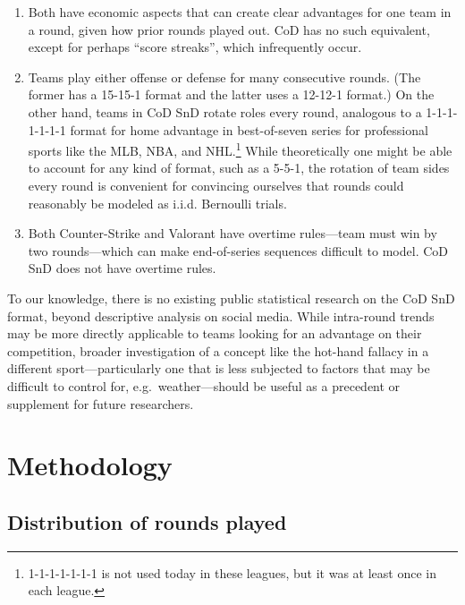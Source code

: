 \documentclass{article}
\providecommand{\tightlist}{%
  \setlength{\itemsep}{0pt}\setlength{\parskip}{0pt}}
\begin{document}
\begin{enumerate}
\def\labelenumi{\arabic{enumi}.}
\tightlist
\item
  Both have economic aspects that can create clear advantages for one
  team in a round, given how prior rounds played out. CoD has no such
  equivalent, except for perhaps ``score streaks'', which infrequently
  occur.
\item
  Teams play either offense or defense for many consecutive rounds. (The
  former has a 15-15-1 format and the latter uses a 12-12-1 format.) On
  the other hand, teams in CoD SnD rotate roles every round, analogous
  to a 1-1-1-1-1-1-1 format for home advantage in best-of-seven series
  for professional sports like the MLB, NBA, and NHL.\footnote{1-1-1-1-1-1-1
    is not used today in these leagues, but it was at least once in each
    league.} While theoretically one might be able to account for any
  kind of format, such as a 5-5-1, the rotation of team sides every
  round is convenient for convincing ourselves that rounds could
  reasonably be modeled as i.i.d. Bernoulli trials.
\item
  Both Counter-Strike and Valorant have overtime rules---team must win
  by two rounds---which can make end-of-series sequences difficult to
  model. CoD SnD does not have overtime rules.
\end{enumerate}

To our knowledge, there is no existing public statistical research on
the CoD SnD format, beyond descriptive analysis on social media. While
intra-round trends may be more directly applicable to teams looking for
an advantage on their competition, broader investigation of a concept
like the hot-hand fallacy in a different sport---particularly one that
is less subjected to factors that may be difficult to control for,
e.g.~weather---should be useful as a precedent or supplement for future
researchers.

\hypertarget{methodology}{%
\section{Methodology}\label{methodology}}

\hypertarget{distribution-of-rounds-played}{%
\subsection{Distribution of rounds
played}\label{distribution-of-rounds-played}}
\end{document}
